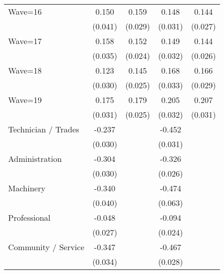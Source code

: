 {\begin{tabular}{l*{4}{c}}
Wave=16             &       0.150\sym{***}&       0.159\sym{***}&       0.148\sym{***}&       0.144\sym{***}\\
                    &     (0.041)         &     (0.029)         &     (0.031)         &     (0.027)         \\
Wave=17             &       0.158\sym{***}&       0.152\sym{***}&       0.149\sym{***}&       0.144\sym{***}\\
                    &     (0.035)         &     (0.024)         &     (0.032)         &     (0.026)         \\
Wave=18             &       0.123\sym{***}&       0.145\sym{***}&       0.168\sym{***}&       0.166\sym{***}\\
                    &     (0.030)         &     (0.025)         &     (0.033)         &     (0.029)         \\
Wave=19             &       0.175\sym{***}&       0.179\sym{***}&       0.205\sym{***}&       0.207\sym{***}\\
                    &     (0.031)         &     (0.025)         &     (0.032)         &     (0.031)         \\
Technician / Trades &      -0.237\sym{***}&                     &      -0.452\sym{***}&                     \\
                    &     (0.030)         &                     &     (0.031)         &                     \\
Administration      &      -0.304\sym{***}&                     &      -0.326\sym{***}&                     \\
                    &     (0.030)         &                     &     (0.026)         &                     \\
Machinery           &      -0.340\sym{***}&                     &      -0.474\sym{***}&                     \\
                    &     (0.040)         &                     &     (0.063)         &                     \\
Professional        &      -0.048\sym{*}  &                     &      -0.094\sym{***}&                     \\
                    &     (0.027)         &                     &     (0.024)         &                     \\
Community / Service &      -0.347\sym{***}&                     &      -0.467\sym{***}&                     \\
                    &     (0.034)         &                     &     (0.028)         &                     \\

\end{tabular}}
